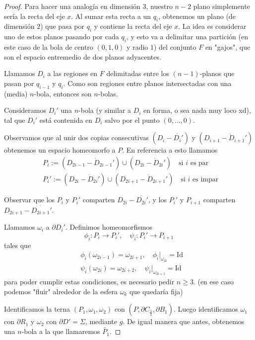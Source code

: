 \begin{proof}
Para hacer una analogía en dimensión $3$, nuestro $n-2$ plano simplemente sería la recta del eje $x$. Al sumar esta recta a un $q_i$, obtenemos un plano (de dimensión $2$) que pasa por $q_i$ y contiene la recta del eje $x$. La idea es considerar uno de estos planos pasando por cada $q_i$, y esto va a delimitar una partición (en este caso de la bola de centro $(0,1,0)$ y radio $1$) del conjunto $F$ en "gajos", que son el espacio entremedio de dos planos adyacentes. 

Llamamos $D_i$ a las regiones en $F$ delimitadas entre los $(n-1)$-planos que pasan por $q_{i-1}$ y $q_i$. Como son regiones entre planos intersectadas con una (media) $n$-bola, entonces son $n$-bolas.

Consideramos $D_i'$ una $n$-bola (y similar a $D_i$ en forma, o sea nada muy loco xd), tal que $D_i'$ está contenida en $D_i$ salvo por el punto $(0,\dots,0)$. 

Observamos que al unir dos copias consecutivas $(D_i - \mathring{D_i'})$ y $(D_{i+1} - \mathring{D}_{i+1}')$ obtenemos un espacio homeomorfo a $P$. En referencia a esto llamamos \begin{align*}
& P_i:=(D_{2i-1} - \mathring{D}_{2i-1}') \cup (D_{2i} - \mathring{D}_{2i}') \quad \text{si } i\text{ es par } \\
& P_i':=(D_{2i} - \mathring{D}_{2i}') \cup (D_{2i+1} - \mathring{D}_{2i+1}') \quad \text{si } i\text{ es impar }
\end{align*}

Observar que los $P_i$ y $P_i'$ comparten $D_{2i}-\mathring{D_{2i}'}$, y los $P_i'$ y $P_{i+1}$ comparten $D_{2i+1}-\mathring{D_{2i+1}'}$.

Llamamos $\omega_i$ a $\partial D_i'$. Definimos homeomorfismos $$\phi_i\colon P_i\to P_i',\quad \psi_i\colon P_i'\to P_{i+1}$$
tales que \begin{align*}
	& \phi_i(\omega_{2i-1})=\omega_{2i+1},\quad\phi_i|_{\omega_{2i}}=\text{Id}\\
	& \psi_i(\omega_{2i})=\omega_{2i+2},\quad\psi_i|_{\omega_{2i+1}}=\text{Id}
\end{align*}
para poder cumplir estas condiciones, es necesario pedir $n\geq 3$. (en ese caso podemos "fluir" alrededor de la esfera $\omega_k$ que quedaría fija)

Identificamos la terna $(P_1,\omega_1,\omega_2)$ con $(P,\partial C_{\frac{1}{2}},\partial B_1)$. Luego identificamos $\omega_1$ con $\partial R_1$ y $\omega_2$ con $\partial D'=\Sigma$, mediante $g$. De igual manera que antes, obtenemos una $n$-bola a la que llamaremos $\tilde{P_1}$.


\end{proof}
